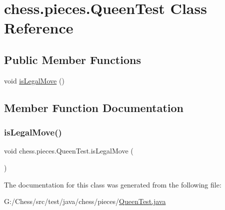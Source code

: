 \hypertarget{classchess_1_1pieces_1_1_queen_test}{}\section{chess.\+pieces.\+Queen\+Test Class Reference}
\label{classchess_1_1pieces_1_1_queen_test}
\subsection*{Public Member Functions}
\begin{DoxyCompactItemize}
\item 
void \mbox{\hyperlink{classchess_1_1pieces_1_1_queen_test_a0e81b5a2eedde2309c8db59fa7f6e26a}{is\+Legal\+Move}} ()
\end{DoxyCompactItemize}


\subsection{Member Function Documentation}
\mbox{\label{classchess_1_1pieces_1_1_queen_test_a0e81b5a2eedde2309c8db59fa7f6e26a}} 
\subsubsection{\texorpdfstring{is\+Legal\+Move()}{isLegalMove()}}
{\footnotesize\ttfamily void chess.\+pieces.\+Queen\+Test.\+is\+Legal\+Move (\begin{DoxyParamCaption}{ }\end{DoxyParamCaption})}



The documentation for this class was generated from the following file\+:\begin{DoxyCompactItemize}
\item 
G\+:/\+Chess/src/test/java/chess/pieces/\mbox{\hyperlink{_queen_test_8java}{Queen\+Test.\+java}}\end{DoxyCompactItemize}
